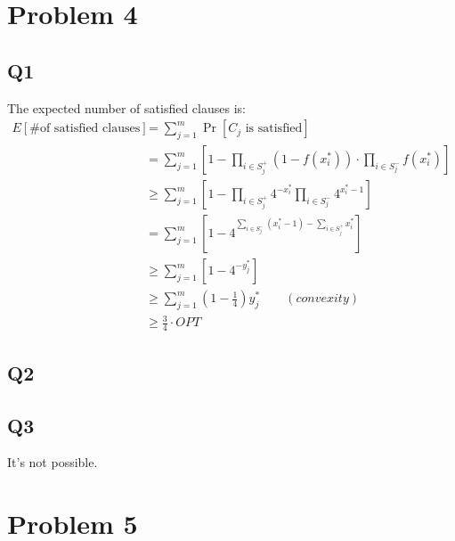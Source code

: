 \documentclass[a4paper, 12pt, titlepage]{article}
\begin{document}
\section{Problem 4}
\subsection{Q1}
The expected number of satisfied clauses is:
\begin{equation}
	\begin{aligned}
		E \left[ \text{\# of satisfied clauses}\right] &= \sum_{j = 1}^{m} \Pr \left[ C_{j} \text{\ is satisfied} \right] \\
		&= \sum_{j = 1}^{m} \left[ 1 - \prod_{i \in S_{j}^{+} } \left( 1- f(x_{i}^{*}) \right) \cdot \prod_{i \in S_{j}^{-} } f(x_{i}^{*}) \right] \\
		&\geq \sum_{j = 1}^{m} \left[ 1 - \prod_{i \in S_{j}^{+} } 4^{-x_{i}^{*}} \prod_{i \in S_{j}^{-} } 4^{x_{i}^{*} - 1} \right] \\
		&= \sum_{j = 1}^{m} \left[ 1- 4^{ \sum_{i \in S_{j}^{-}} (x_{i}^{*} - 1) - \sum_{i \in S_{j}^{+} } x_{i}^{*} } \right] \\
		&\geq \sum_{j = 1}^{m} \left[ 1 - 4^{- y_{j}^{*}} \right] \\
		&\geq \sum_{j = 1}^{m} \left(1 - \frac{1}{4} \right) y_{j}^{*} \qquad (convexity)\\
		&\geq \frac{3}{4} \cdot OPT
	\end{aligned}
\end{equation}
\subsection{Q2}



\subsection{Q3}
It's not possible.

\section{Problem 5}
\end{document}
